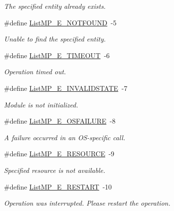 \begin{DoxyCompactItemize}
\begin{DoxyCompactList}\small\item\em The specified entity already exists. \end{DoxyCompactList}\item 
\#define \hyperlink{_list_m_p_8h_ad1094272ac41cf2b022d6c514beaceac}{List\-M\-P\-\_\-\-E\-\_\-\-N\-O\-T\-F\-O\-U\-N\-D}~-\/5
\begin{DoxyCompactList}\small\item\em Unable to find the specified entity. \end{DoxyCompactList}\item 
\#define \hyperlink{_list_m_p_8h_a163b8195b54eab051c94c37b6f76a3c0}{List\-M\-P\-\_\-\-E\-\_\-\-T\-I\-M\-E\-O\-U\-T}~-\/6
\begin{DoxyCompactList}\small\item\em Operation timed out. \end{DoxyCompactList}\item 
\#define \hyperlink{_list_m_p_8h_a1f5136445766b775f24f09fbc1e77531}{List\-M\-P\-\_\-\-E\-\_\-\-I\-N\-V\-A\-L\-I\-D\-S\-T\-A\-T\-E}~-\/7
\begin{DoxyCompactList}\small\item\em Module is not initialized. \end{DoxyCompactList}\item 
\#define \hyperlink{_list_m_p_8h_a71a0081f7de24109c2b91f209b3d9d3d}{List\-M\-P\-\_\-\-E\-\_\-\-O\-S\-F\-A\-I\-L\-U\-R\-E}~-\/8
\begin{DoxyCompactList}\small\item\em A failure occurred in an O\-S-\/specific call. \end{DoxyCompactList}\item 
\#define \hyperlink{_list_m_p_8h_a17bd29505d65eb1130a9526bb842507c}{List\-M\-P\-\_\-\-E\-\_\-\-R\-E\-S\-O\-U\-R\-C\-E}~-\/9
\begin{DoxyCompactList}\small\item\em Specified resource is not available. \end{DoxyCompactList}\item 
\#define \hyperlink{_list_m_p_8h_a6fd9b6b57f38d4be617d2fdae5f4d4e8}{List\-M\-P\-\_\-\-E\-\_\-\-R\-E\-S\-T\-A\-R\-T}~-\/10
\begin{DoxyCompactList}\small\item\em Operation was interrupted. Please restart the operation. \end{DoxyCompactList}\end{DoxyCompactItemize}
